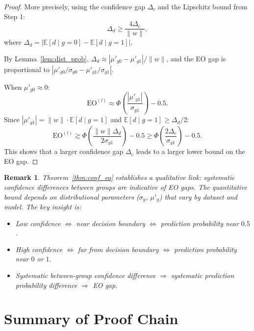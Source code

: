 \documentclass[11pt]{article}
\newtheorem{remark}[theorem]{Remark}
\begin{document}
\begin{proof}
    More precisely, using the confidence gap $\Delta_c$ and the Lipschitz bound from Step 1:
    \begin{equation}
        \Delta_d \geq \frac{4 \Delta_c}{\|w\|},
    \end{equation}
    where $\Delta_d = |\mathbb{E}[d \mid g=0] - \mathbb{E}[d \mid g=1]|$.

    By Lemma~\ref{lem:dist_prob}, $\Delta_d \approx |\mu'_{g0} - \mu'_{g1}|/\|w\|$, and the EO gap is proportional to $|\mu'_{g0}/\sigma_{g0} - \mu'_{g1}/\sigma_{g1}|$.

    When $\mu'_{g0} \approx 0$:
    \begin{equation}
        \mathrm{EO}^{(l)} \approx \Phi\!\left(\frac{|\mu'_{g1}|}{\sigma_{g1}}\right) - 0.5.
    \end{equation}
    Since $|\mu'_{g1}| = \|w\| \cdot \mathbb{E}[d \mid g=1]$ and $\mathbb{E}[d \mid g=1] \geq \Delta_d/2$:
    \begin{equation}
        \mathrm{EO}^{(l)} \gtrsim \Phi\!\left(\frac{\|w\| \Delta_d}{2\sigma_{g1}}\right) - 0.5 \geq \Phi\!\left(\frac{2\Delta_c}{\sigma_{g1}}\right) - 0.5.
    \end{equation}
    This shows that a larger confidence gap $\Delta_c$ leads to a larger lower bound on the EO gap.
\end{proof}

\begin{remark}
    Theorem~\ref{thm:conf_eo} establishes a \emph{qualitative} link: systematic confidence differences between groups are indicative of EO gaps. The quantitative bound depends on distributional parameters ($\sigma_g$, $\mu'_g$) that vary by dataset and model. The key insight is:
    \begin{itemize}
        \item Low confidence $\Leftrightarrow$ near decision boundary $\Leftrightarrow$ prediction probability near $0.5$.
        \item High confidence $\Leftrightarrow$ far from decision boundary $\Leftrightarrow$ prediction probability near $0$ or $1$.
        \item Systematic between-group confidence difference $\Rightarrow$ systematic prediction probability difference $\Rightarrow$ EO gap.
    \end{itemize}
\end{remark}


\section{Summary of Proof Chain}
\end{document}
